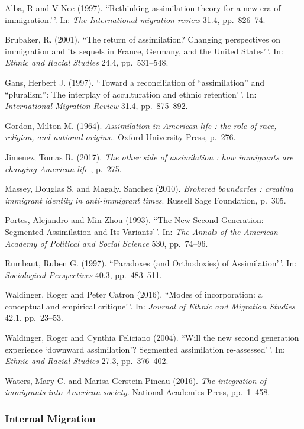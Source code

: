 \documentclass[11pt,]{article}
\begin{document}
Alba, R and V Nee (1997). ``Rethinking assimilation theory for a new era
of immigration.'\,'. In: \emph{The International migration review} 31.4,
pp.~826--74.

Brubaker, R. (2001). ``The return of assimilation? Changing perspectives
on immigration and its sequels in France, Germany, and the United
States'\,'. In: \emph{Ethnic and Racial Studies} 24.4, pp.~531--548.

Gans, Herbert J. (1997). ``Toward a reconciliation of ``assimilation''
and ``pluralism'': The interplay of acculturation and ethnic
retention'\,'. In: \emph{International Migration Review} 31.4,
pp.~875--892.

Gordon, Milton M. (1964).
\emph{Assimilation in American life : the role of race, religion, and national origins.}.
Oxford University Press, p.~276.

Jimenez, Tomas R. (2017).
\emph{The other side of assimilation : how immigrants are changing American life}
, p.~275.

Massey, Douglas S. and Magaly. Sanchez (2010).
\emph{Brokered boundaries : creating immigrant identity in anti-immigrant times}.
Russell Sage Foundation, p.~305.

Portes, Alejandro and Min Zhou (1993). ``The New Second Generation:
Segmented Assimilation and Its Variants'\,'. In:
\emph{The Annals of the American Academy of Political and Social Science}
530, pp.~74--96.

Rumbaut, Ruben G. (1997). ``Paradoxes (and Orthodoxies) of
Assimilation'\,'. In: \emph{Sociological Perspectives} 40.3,
pp.~483--511.

Waldinger, Roger and Peter Catron (2016). ``Modes of incorporation: a
conceptual and empirical critique'\,'. In:
\emph{Journal of Ethnic and Migration Studies} 42.1, pp.~23--53.

Waldinger, Roger and Cynthia Feliciano (2004). ``Will the new second
generation experience `downward assimilation'? Segmented assimilation
re-assessed'\,'. In: \emph{Ethnic and Racial Studies} 27.3,
pp.~376--402.

Waters, Mary C. and Marisa Gerstein Pineau (2016).
\emph{The integration of immigrants into American society}. National
Academies Press, pp.~1--458.

\hypertarget{internal-migration}{%
\subsubsection{Internal Migration}\label{internal-migration}}
\end{document}
